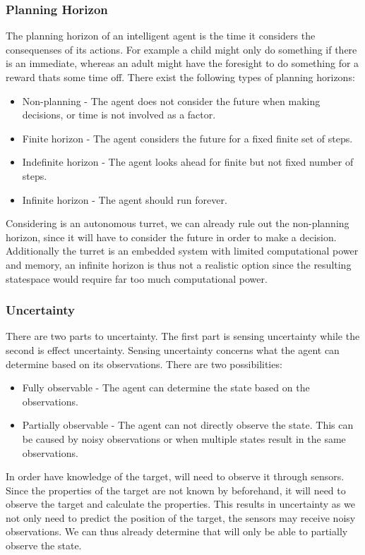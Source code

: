\subsubsection{Planning Horizon}
The planning horizon of an intelligent agent is the time it considers the
consequenses of its actions. For example a child might only do something if
there is an immediate, whereas an adult might have the foresight to do something
for a reward thats some time off. There exist the following types of planning
horizons:
\begin{itemize}
	\item Non-planning - The agent does not consider the future when making
	decisions, or time is not involved as a factor.
	\item Finite horizon - The agent considers the future for a fixed finite set
	of steps. 
	\item Indefinite horizon - The agent looks ahead for finite but not fixed
	number of steps.
	\item Infinite horizon - The agent should run forever.	
\end{itemize}

Considering \name is an autonomous turret, we can already rule out the
non-planning horizon, since it will have to consider the future in order to
make a decision. Additionally the turret is an embedded system with limited
computational power and memory, an infinite horizon is thus not a realistic
option since the resulting statespace would require far too much computational
power.

\subsubsection{Uncertainty}

There are two parts to uncertainty. The first part is sensing uncertainty while
the second is effect uncertainty. Sensing uncertainty concerns what the agent
can determine based on its observations. There are two possibilities:
\begin{itemize}
  \item Fully observable - The agent can determine the state based on
  the observations.
  \item Partially observable - The agent can not directly observe the state.
  This can be caused by noisy observations or when multiple states result in the
  same observations.
\end{itemize}
In order have knowledge of the target, \name will need to observe it through
sensors. Since the properties of the target are not known by \name beforehand,
it will need to observe the target and calculate the properties. This results
in uncertainty as we not only need to predict the position of the target, the
sensors may receive noisy observations. We can thus already determine that \name
will only be able to partially observe the state.\nl

